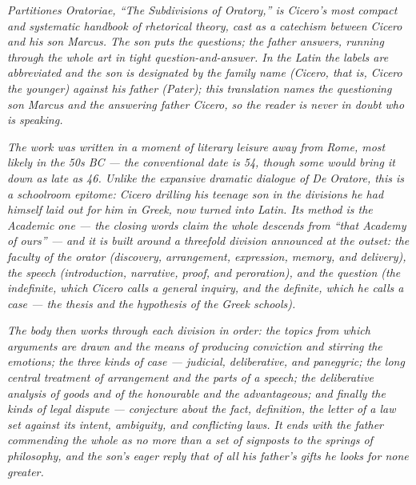 
\textit{Partitiones Oratoriae, ``The Subdivisions of Oratory,'' is
Cicero's most compact and systematic handbook of rhetorical theory,
cast as a catechism between Cicero and his son Marcus. The son puts the
questions; the father answers, running through the whole art in tight
question-and-answer. In the Latin the labels are abbreviated and the
son is designated by the family name (\textit{Cicero}, that is, Cicero
the younger) against his father (\textit{Pater}); this translation
names the questioning son Marcus and the answering father Cicero, so
the reader is never in doubt who is speaking.}

\textit{The work was written in a moment of literary leisure away from
Rome, most likely in the 50s BC --- the conventional date is 54, though
some would bring it down as late as 46. Unlike the expansive dramatic
dialogue of De Oratore, this is a schoolroom epitome: Cicero drilling
his teenage son in the divisions he had himself laid out for him in
Greek, now turned into Latin. Its method is the Academic one --- the
closing words claim the whole descends from ``that Academy of ours'' ---
and it is built around a threefold division announced at the outset: the
faculty of the orator (discovery, arrangement, expression, memory, and
delivery), the speech (introduction, narrative, proof, and peroration),
and the question (the indefinite, which Cicero calls a general inquiry,
and the definite, which he calls a case --- the thesis and the
hypothesis of the Greek schools).}

\textit{The body then works through each division in order: the topics
from which arguments are drawn and the means of producing conviction and
stirring the emotions; the three kinds of case --- judicial,
deliberative, and panegyric; the long central treatment of arrangement
and the parts of a speech; the deliberative analysis of goods and of the
honourable and the advantageous; and finally the kinds of legal dispute
--- conjecture about the fact, definition, the letter of a law set
against its intent, ambiguity, and conflicting laws. It ends with the
father commending the whole as no more than a set of signposts to the
springs of philosophy, and the son's eager reply that of all his
father's gifts he looks for none greater.}
